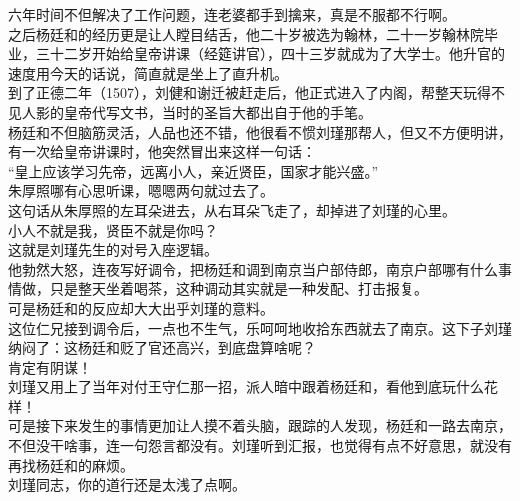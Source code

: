 \begin{multicols}{\theparacolNo}
六年时间不但解决了工作问题，连老婆都手到擒来，真是不服都不行啊。\\

之后杨廷和的经历更是让人瞠目结舌，他二十岁被选为翰林，二十一岁翰林院毕业，三十二岁开始给皇帝讲课（经筵讲官），四十三岁就成为了大学士。他升官的速度用今天的话说，简直就是坐上了直升机。\\

到了正德二年（1507），刘健和谢迁被赶走后，他正式进入了内阁，帮整天玩得不见人影的皇帝代写文书，当时的圣旨大都出自于他的手笔。\\

杨廷和不但脑筋灵活，人品也还不错，他很看不惯刘瑾那帮人，但又不方便明讲，有一次给皇帝讲课时，他突然冒出来这样一句话：\\

“皇上应该学习先帝，远离小人，亲近贤臣，国家才能兴盛。”\\

朱厚照哪有心思听课，嗯嗯两句就过去了。\\

这句话从朱厚照的左耳朵进去，从右耳朵飞走了，却掉进了刘瑾的心里。\\

小人不就是我，贤臣不就是你吗？\\

这就是刘瑾先生的对号入座逻辑。\\

他勃然大怒，连夜写好调令，把杨廷和调到南京当户部侍郎，南京户部哪有什么事情做，只是整天坐着喝茶，这种调动其实就是一种发配、打击报复。\\

可是杨廷和的反应却大大出乎刘瑾的意料。\\

这位仁兄接到调令后，一点也不生气，乐呵呵地收拾东西就去了南京。这下子刘瑾纳闷了：这杨廷和贬了官还高兴，到底盘算啥呢？\\

肯定有阴谋！\\

刘瑾又用上了当年对付王守仁那一招，派人暗中跟着杨廷和，看他到底玩什么花样！\\

可是接下来发生的事情更加让人摸不着头脑，跟踪的人发现，杨廷和一路去南京，不但没干啥事，连一句怨言都没有。刘瑾听到汇报，也觉得有点不好意思，就没有再找杨廷和的麻烦。\\

刘瑾同志，你的道行还是太浅了点啊。\\


\end{multicols}

